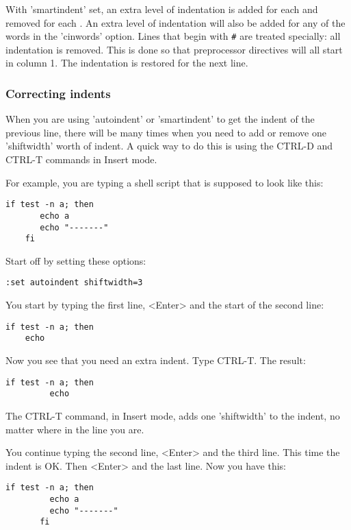 With 'smartindent' set, an extra level of indentation is added for each { and removed for each }.
An extra level of indentation will also be added for any of the words in the 'cinwords' option.
Lines that begin with \verb!#! are treated specially: all indentation is removed.
This is done so that preprocessor directives will all start in column 1.
The indentation is restored for the next line.

\subsubsection{Correcting indents}
When you are using 'autoindent' or 'smartindent' to get the indent of the previous line, there will be many times when you need to add or remove one 'shiftwidth' worth of indent.
A quick way to do this is using the CTRL-D and CTRL-T commands in Insert mode.

For example, you are typing a shell script that is supposed to look like this:

\begin{Verbatim}[samepage=true]
    if test -n a; then 
       echo a 
       echo "-------" 
    fi 
\end{Verbatim}

Start off by setting these options:

\begin{Verbatim}[samepage=true]
 :set autoindent shiftwidth=3
\end{Verbatim}

You start by typing the first line, <Enter> and the start of the second line:

\begin{Verbatim}[samepage=true]
    if test -n a; then 
    echo 
\end{Verbatim}

Now you see that you need an extra indent.
Type CTRL-T.
The result:

\begin{Verbatim}[samepage=true]
    if test -n a; then 
         echo 
\end{Verbatim}

The CTRL-T command, in Insert mode, adds one 'shiftwidth' to the indent, no matter where in the line you are.

You continue typing the second line, <Enter> and the third line.
This time the indent is OK.
Then <Enter> and the last line.
Now you have this:

\begin{Verbatim}[samepage=true]
    if test -n a; then 
         echo a 
         echo "-------" 
       fi 
\end{Verbatim}

